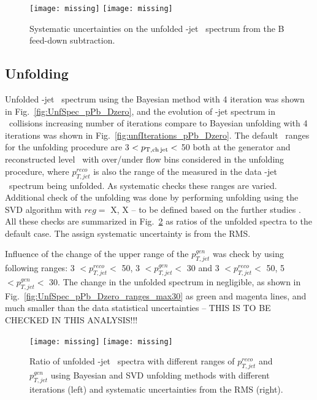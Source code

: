 \begin{figure}[bth]
\begin{center}
\texttt{[image: missing]}
\texttt{[image: missing]}
\caption{Systematic uncertainties on the unfolded \Dzero-jet \pt\ spectrum from the B feed-down subtraction.} 
\label{fig:BFeedDown_sysUnc_Dzero}
\end{center}
\end{figure}


\subsection{Unfolding}
\label{sUnfoldSys}

Unfolded \Dzero-jet \pt\ spectrum using the Bayesian method with 4 iteration was shown in Fig.~\ref{fig:UnfSpec_pPb_Dzero}, and the evolution of \Dzero-jet spectrum in \pp\ collisions increasing number of iterations compare to Bayesian unfolding with 4 iterations was shown in Fig.~\ref{fig:unfIterations_pPb_Dzero}. 
The default \ptchjet\ ranges for the unfolding procedure are 3 $< p_{\mathrm{T,ch\, jet}}< $ 50 both at the generator and reconstructed level \pt\, with over/under flow bins considered in the unfolding procedure, where $p_{T,jet}^{reco}$ is also the range of the measured in the data \Dzero-jet \pt\ spectrum being unfolded. 
As systematic checks these ranges are varied.
Additional check of the unfolding was done by performing unfolding using the SVD algorithm with $reg=$ {\color{red} X, X -- to be defined based on the further studies} .
All these checks are summarized in Fig.~\ref{fig:UnfSpec_pPb_Dzero_ranges} as ratios of the unfolded spectra to the default case. The assign systematic uncertainty is from the RMS.

Influence of the change of the upper range of the $p_{T,jet}^{gen}$ was check by using following ranges: 3 $<  p_{T,jet}^{reco} < $ 50, 3 $<  p_{T,jet}^{gen} < $ 30 and 3 $<  p_{T,jet}^{reco} < $ 50, 5 $<  p_{T,jet}^{gen} < $ 30. {\color{red} The change in the unfolded spectrum in negligible, as shown in Fig.~\ref{fig:UnfSpec_pPb_Dzero_ranges_max30} as green and magenta lines, and much smaller than the data statistical uncertainties -- THIS IS TO BE CHECKED IN THIS ANALYSIS!!! }

\begin{figure}[bth]
\centering
\texttt{[image: missing]}
\texttt{[image: missing]}
\caption{Ratio of unfolded \Dzero-jet \pt\ spectra with different ranges of $p_{T,jet}^{reco}$ and $p_{T,jet}^{gen}$ using Bayesian and SVD unfolding methods with different iterations (left) and systematic uncertainties from the RMS (right).}
\label{fig:UnfSpec_pPb_Dzero_ranges}
\end{figure}

